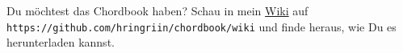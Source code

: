 
\begin{center}
    \begin{minipage}[h]{0.7\textwidth}
        \begin{tcolorbox}[colback=blue!7,colframe=blue!70!black,fonttitle=\bfseries,title=Download]
            Du m\"{o}chtest das Chordbook haben? Schau in mein \href{https://github.com/hringriin/chordbook/wiki}{Wiki} auf \texttt{https://github.com/hringriin/chordbook/wiki} und finde heraus, wie Du es herunterladen kannst.
        \end{tcolorbox}
    \end{minipage}
\end{center}
